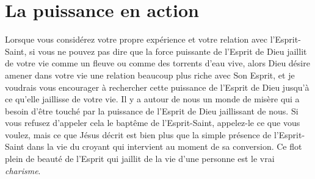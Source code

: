 \section{La puissance en action}


Lorsque vous considérez votre propre expérience 
 et votre relation 
 avec l'Esprit-Saint, si vous ne pouvez pas dire que la force puissante
 de l'Esprit de Dieu jaillit de votre vie comme un fleuve ou comme
 des torrents d'eau vive, alors Dieu désire amener dans votre vie une relation
 beaucoup plus riche avec Son Esprit,
 et je voudrais vous encourager à rechercher cette puissance de l'Esprit
 de Dieu jusqu'à ce qu'elle jaillisse de votre vie.
 Il y a autour de nous un monde de misère qui a besoin d'être touché
 par la puissance de l'Esprit de Dieu jaillissant de nous.
 Si vous refusez d'appeler cela le baptême de l'Esprit-Saint,
 appelez-le ce que vous voulez, mais ce que Jésus décrit est bien plus
 que la simple présence de l'Esprit-Saint dans la vie du croyant
 qui intervient au moment de sa conversion. Ce flot plein de beauté de l'Esprit
 qui jaillit de la vie d'une personne est le vrai \emph{charisme}.
\thispagestyle{chapterend}

